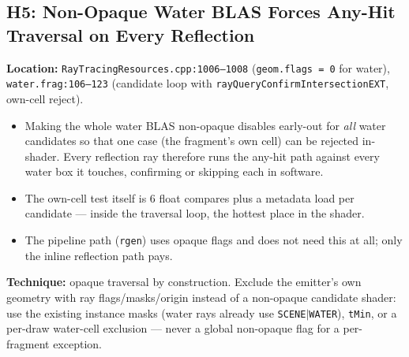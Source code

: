 \documentclass[11pt,a4paper]{article}
\begin{document}
\subsection{H5: Non-Opaque Water BLAS Forces Any-Hit Traversal on Every Reflection}

\textbf{Location:} \texttt{RayTracingResources.cpp:1006--1008} (\texttt{geom.flags = 0} for water), \texttt{water.frag:106--123} (candidate loop with \texttt{rayQueryConfirmIntersectionEXT}, own-cell reject).

\begin{itemize}
    \item Making the whole water BLAS non-opaque disables early-out for \textit{all} water candidates so that one case (the fragment's own cell) can be rejected in-shader. Every reflection ray therefore runs the any-hit path against every water box it touches, confirming or skipping each in software.
    \item The own-cell test itself is 6 float compares plus a metadata load per candidate --- inside the traversal loop, the hottest place in the shader.
    \item The pipeline path (\texttt{rgen}) uses opaque flags and does not need this at all; only the inline reflection path pays.
\end{itemize}

\textbf{Technique:} opaque traversal by construction. Exclude the emitter's own geometry with ray flags/masks/origin instead of a non-opaque candidate shader: use the existing instance masks (water rays already use \texttt{SCENE$|$WATER}), \texttt{tMin}, or a per-draw water-cell exclusion --- never a global non-opaque flag for a per-fragment exception.
\end{document}

